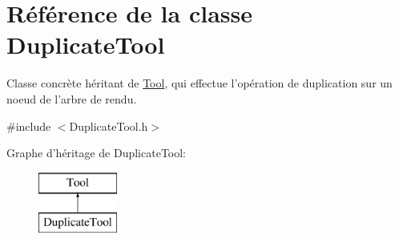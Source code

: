 \hypertarget{class_duplicate_tool}{\section{Référence de la classe Duplicate\-Tool}
\label{class_duplicate_tool}
}


Classe concrète héritant de \hyperlink{class_tool}{Tool}, qui effectue l'opération de duplication sur un noeud de l'arbre de rendu.  




{\ttfamily \#include $<$Duplicate\-Tool.\-h$>$}

Graphe d'héritage de Duplicate\-Tool\-:\begin{figure}[H]
\begin{center}
\leavevmode
\includegraphics[height=2.000000cm]{class_duplicate_tool}
\end{center}
\end{figure}
